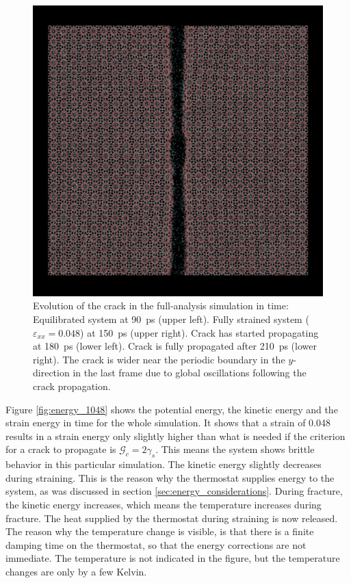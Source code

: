 \begin{figure}
\begin{minipage}[b]{0.5\linewidth}
\end{minipage}
\begin{minipage}[b]{0.5\linewidth}
\includegraphics[width=\textwidth]{../snapshots/c_4.pdf}
\end{minipage}
\caption{Evolution of the crack in the full-analysis simulation in time: Equilibrated system at \SI{90}{\pico\second} (upper left). Fully strained system ($\varepsilon_{xx} = 0.048$) at \SI{150}{\pico\second} (upper right). Crack has started propagating at \SI{180}{\pico\second}  (lower left). Crack is fully propagated after \SI{210}{\pico\second}  (lower right). The crack is wider near the periodic boundary in the $y$-direction in the last frame due to global oscillations following the crack propagation.}
\label{fig:crack_evolution}
\end{figure}

Figure \ref{fig:energy_1048} shows the potential energy, the kinetic energy and the strain energy in time for the whole simulation. It shows that a strain of 0.048 results in a strain energy only slightly higher than what is needed if the criterion for a crack to propagate is $\mathcal{G}_c = 2\gamma_s$. This means the system shows brittle behavior in this particular simulation. The kinetic energy slightly decreases during straining. This is the reason why the thermostat supplies energy to the system, as was discussed in section \ref{sec:energy_considerations}. During fracture, the kinetic energy increases, which means the temperature increases during fracture. The heat supplied by the thermostat during straining is now released. The reason why the temperature change is visible, is that there is a finite damping time on the thermostat, so that the energy corrections are not immediate. The temperature is not indicated in the figure, but the temperature changes are only by a few Kelvin. 

